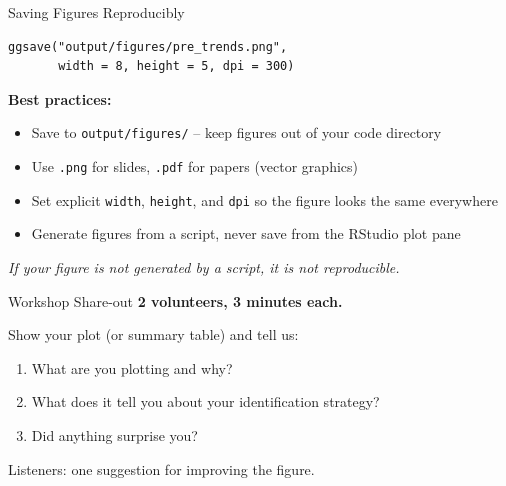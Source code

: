 \begin{frame}[fragile]{Saving Figures Reproducibly}
\begin{lstlisting}[style=terminal, basicstyle=\ttfamily\footnotesize\color{darkgray}]
ggsave("output/figures/pre_trends.png",
       width = 8, height = 5, dpi = 300)
\end{lstlisting}

  \vspace{8pt}

  \textbf{Best practices:}
  \begin{itemize}
    \item Save to \texttt{output/figures/} -- keep figures out of your code directory
    \item Use \texttt{.png} for slides, \texttt{.pdf} for papers (vector graphics)
    \item Set explicit \texttt{width}, \texttt{height}, and \texttt{dpi} so the figure looks the same everywhere
    \item Generate figures from a script, never save from the RStudio plot pane
  \end{itemize}

  \vspace{4pt}

  \textit{If your figure is not generated by a script, it is not reproducible.}
\end{frame}

\begin{frame}{Workshop Share-out}
  \textbf{2 volunteers, 3 minutes each.}

  \vspace{10pt}

  Show your plot (or summary table) and tell us:
  \begin{enumerate}
    \item What are you plotting and why?
    \item What does it tell you about your identification strategy?
    \item Did anything surprise you?
  \end{enumerate}

  \vspace{10pt}

  Listeners: one suggestion for improving the figure.
\end{frame}


